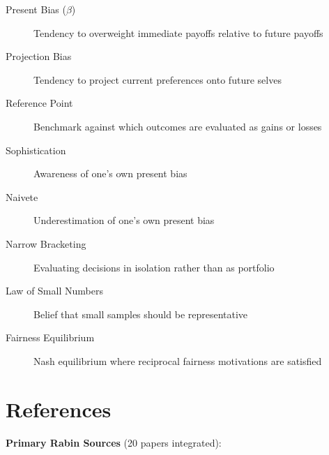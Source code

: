 \begin{description}
    \item[Present Bias ($\beta$)] Tendency to overweight immediate payoffs relative to future payoffs
    \item[Projection Bias] Tendency to project current preferences onto future selves
    \item[Reference Point] Benchmark against which outcomes are evaluated as gains or losses
    \item[Sophistication] Awareness of one's own present bias
    \item[Naivete] Underestimation of one's own present bias
    \item[Narrow Bracketing] Evaluating decisions in isolation rather than as portfolio
    \item[Law of Small Numbers] Belief that small samples should be representative
    \item[Fairness Equilibrium] Nash equilibrium where reciprocal fairness motivations are satisfied
\end{description}

\section{References}

\nocite{bcm_master}

\textbf{Primary Rabin Sources} (20 papers integrated):

